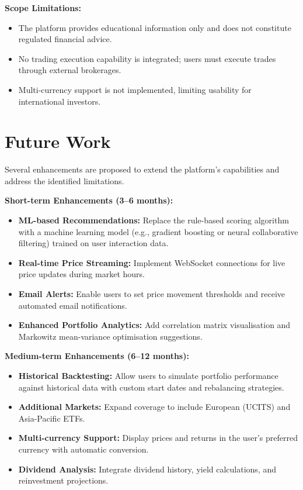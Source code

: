\textbf{Scope Limitations:}
\begin{itemize}
    \item The platform provides educational information only and does not constitute regulated financial advice.
    \item No trading execution capability is integrated; users must execute trades through external brokerages.
    \item Multi-currency support is not implemented, limiting usability for international investors.
\end{itemize}

\section{Future Work}
\label{sec:future-work}

Several enhancements are proposed to extend the platform's capabilities and address the identified limitations.

\textbf{Short-term Enhancements (3--6 months):}
\begin{itemize}
    \item \textbf{ML-based Recommendations:} Replace the rule-based scoring algorithm with a machine learning model (e.g., gradient boosting or neural collaborative filtering) trained on user interaction data.
    \item \textbf{Real-time Price Streaming:} Implement WebSocket connections for live price updates during market hours.
    \item \textbf{Email Alerts:} Enable users to set price movement thresholds and receive automated email notifications.
    \item \textbf{Enhanced Portfolio Analytics:} Add correlation matrix visualisation and Markowitz mean-variance optimisation suggestions.
\end{itemize}

\textbf{Medium-term Enhancements (6--12 months):}
\begin{itemize}
    \item \textbf{Historical Backtesting:} Allow users to simulate portfolio performance against historical data with custom start dates and rebalancing strategies.
    \item \textbf{Additional Markets:} Expand coverage to include European (UCITS) and Asia-Pacific ETFs.
    \item \textbf{Multi-currency Support:} Display prices and returns in the user's preferred currency with automatic conversion.
    \item \textbf{Dividend Analysis:} Integrate dividend history, yield calculations, and reinvestment projections.
\end{itemize}


